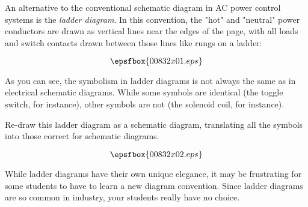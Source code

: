 

An alternative to the conventional schematic diagram in AC power control systems is the {\it ladder diagram}.  In this convention, the "hot" and "neutral" power conductors are drawn as vertical lines near the edges of the page, with all loads and switch contacts drawn between those lines like rungs on a ladder:

$$\epsfbox{00832x01.eps}$$

As you can see, the symbolism in ladder diagrams is not always the same as in electrical schematic diagrams.  While some symbols are identical (the toggle switch, for instance), other symbols are not (the solenoid coil, for instance).

Re-draw this ladder diagram as a schematic diagram, translating all the symbols into those correct for schematic diagrams.







$$\epsfbox{00832x02.eps}$$







While ladder diagrams have their own unique elegance, it may be frustrating for some students to have to learn a new diagram convention.  Since ladder diagrams are so common in industry, your students really have no choice.




